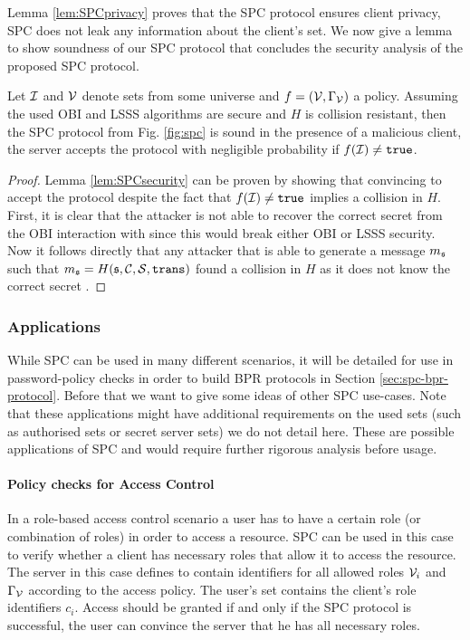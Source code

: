 \noindent
Lemma \ref{lem:SPCprivacy} proves that the \ac{SPC} protocol ensures client privacy, \ie \ac{SPC} does not leak any information about the client's set.
We now give a lemma to show soundness of our \ac{SPC} protocol that concludes the security analysis of the proposed \ac{SPC} protocol.

\begin{lemma}[Soundness]\label{lem:SPCsecurity}
  Let $\mathcal{I}$ and $\mathcal{V}$ denote sets from some universe and $f=(\mathcal{V},\Gamma_\mathcal{V})$ a policy.
  Assuming the used \ac{OBI} and \ac{LSSS} algorithms are secure and $H$ is collision resistant, then the \ac{SPC} protocol from Fig. \ref{fig:spc} is sound in the presence of a malicious client, \ie the server accepts the protocol with negligible probability if $f(\mathcal{I})\not=\mathtt{true}$.
\end{lemma}

\begin{proof}
Lemma \ref{lem:SPCsecurity} can be proven by showing that convincing \Server to accept the protocol despite the fact that $f(\mathcal{I})\not=\mathtt{true}$ implies a collision in $H$.
First, it is clear that the attacker is not able to recover the correct secret \secret from the \ac{OBI} interaction with \Server since this would break either \ac{OBI} or \ac{LSSS} security.
Now it follows directly that any attacker that is able to generate a message $m_\mathfrak{s}$ such that $m_\mathfrak{s}=H(\mathfrak{s},\mathcal{C},\mathcal{S},\mathtt{trans})$ found a collision in $H$ as it does not know the correct secret \secret.
\end{proof}


\subsubsection{Applications}\label{sec:generalisation}
While \ac{SPC} can be used in many different scenarios, it will be detailed for use in password-policy checks in order to build \ac{BPR} protocols in Section \ref{sec:spc-bpr-protocol}.
Before that we want to give some ideas of other \ac{SPC} use-cases.
Note that these applications might have additional requirements on the used sets (such as authorised sets or secret server sets) we do not detail here.
These are possible applications of \ac{SPC} and would require further rigorous analysis before usage.

\paragraph{Policy checks for Access Control}
In a role-based access control scenario \cite{FerraioloK09} a user has to have a certain role (or combination of roles) in order to access a resource.
\ac{SPC} can be used in this case to verify whether a client has necessary roles that allow it to access the resource.
The server in this case defines \ServerSet to contain identifiers for all allowed roles $\mathcal{V}_i$ and $\Gamma_\mathcal{V}$ according to the access policy.
The user's set \ClientSet contains the client's role identifiers $c_i$.
Access should be granted if and only if the \ac{SPC} protocol is successful, \ie the user can convince the server that he has all necessary roles.

